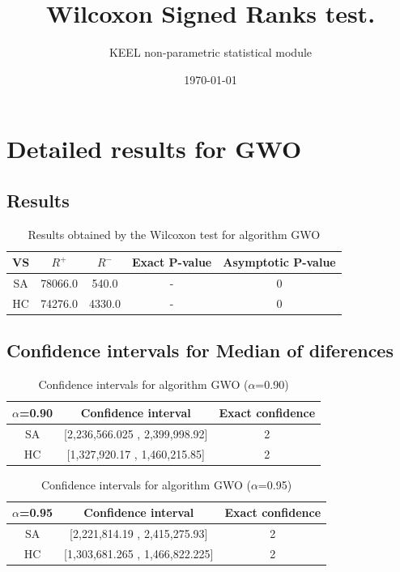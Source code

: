 \documentclass[a4paper,10pt]{article}
\title{Wilcoxon Signed Ranks test.}
\date{\today}
\author{KEEL non-parametric statistical module}
\begin{document}
\pagestyle{empty}
\maketitle
\thispagestyle{empty}



\section{Detailed results for GWO}


\subsection{Results}

\begin{table}[!htp]
\centering\small
\begin{tabular}{
|c|c|c|c|c|}
\hline
 VS & $R^{+}$ & $R^{-}$ & Exact P-value & Asymptotic P-value \\ \hline 
SA & 78066.0 & 540.0 & - & 0\\ \hline 
HC & 74276.0 & 4330.0 & - & 0\\ \hline 

\end{tabular}
\caption{Results obtained by the Wilcoxon test for algorithm GWO}
\end{table}

\subsection{Confidence intervals for Median of diferences}

\begin{table}[!htp]
\centering\small
\begin{tabular}{
|c|c|c|}
\hline
 $\alpha$=0.90 & Confidence interval & Exact confidence \\ \hline 
SA & [2,236,566.025 , 2,399,998.92] & 2\\ \hline 
HC & [1,327,920.17 , 1,460,215.85] & 2\\ \hline 

\end{tabular}
\caption{Confidence intervals for algorithm GWO ($\alpha$=0.90)}
\end{table}
\begin{table}[!htp]
\centering\small
\begin{tabular}{
|c|c|c|}
\hline
 $\alpha$=0.95 & Confidence interval & Exact confidence \\ \hline 
SA & [2,221,814.19 , 2,415,275.93] & 2\\ \hline 
HC & [1,303,681.265 , 1,466,822.225] & 2\\ \hline 

\end{tabular}
\caption{Confidence intervals for algorithm GWO ($\alpha$=0.95)}
\end{table}
\end{document}
